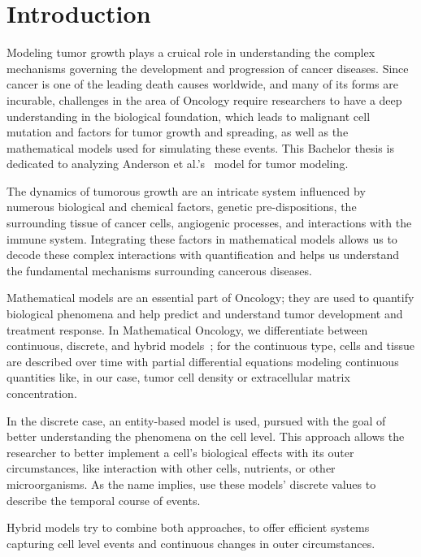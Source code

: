 \section{Introduction}
Modeling tumor growth plays a cruical role in understanding the complex mechanisms governing the development and progression of cancer diseases. Since cancer is one of the leading death causes worldwide, and many of its forms are incurable, challenges in the area of Oncology require researchers to have a deep understanding in the biological foundation, which leads to malignant cell mutation and factors for tumor growth and spreading, as well as the mathematical models used for simulating these events. This Bachelor thesis is dedicated to analyzing Anderson et al.'s~\cite{anderson_continuous_1998,anderson_mathematical_2000} model for tumor modeling.

The dynamics of tumorous growth are an intricate system influenced by numerous biological and chemical factors, genetic pre-dispositions, the surrounding tissue of cancer cells, angiogenic processes, and interactions with the immune system. Integrating these factors in mathematical models allows us to decode these complex interactions with quantification and helps us understand the fundamental mechanisms surrounding cancerous diseases.

Mathematical models are an essential part of Oncology; they are used to quantify biological phenomena and help predict and understand tumor development and treatment response. In Mathematical Oncology, we differentiate between continuous, discrete, and hybrid models~\cite{BEKISZ2020101198}; for the continuous type, cells and tissue are described over time with partial differential equations modeling continuous quantities like, in our case, tumor cell density or extracellular matrix concentration.

In the discrete case, an entity-based model is used, pursued with the goal of better understanding the phenomena on the cell level. This approach allows the researcher to better implement a cell's biological effects with its outer circumstances, like interaction with other cells, nutrients, or other microorganisms. As the name implies, use these models' discrete values to describe the temporal course of events.

Hybrid models try to combine both approaches, to offer efficient systems capturing cell level events and continuous changes in outer circumstances.

